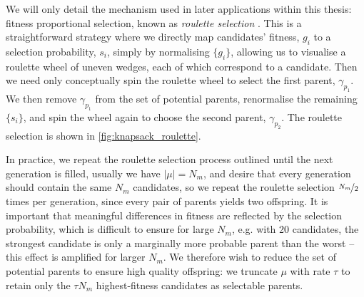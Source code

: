 We will only detail the mechanism used in later applications within this thesis: 
    fitness proportional selection, known as \emph{roulette selection} \cite{luke11}. 
This is a straightforward strategy where we directly map candidates' fitness, $g_i$ to a selection probability, $s_i$,
    simply by normalising $\{g_i\}$, 
    allowing us to visualise a roulette wheel of uneven wedges, each of which correspond to a candidate. 
Then we need only conceptually spin the roulette wheel to select the first parent, $\gamma_{p_1}$. 
We then remove $\gamma_{p_1}$ from the set of potential parents, renormalise the remaining $\{s_i\}$, 
    and spin the wheel again to choose the second parent, $\gamma_{p_2}$. 
The roulette selection is shown in \cref{fig:knapsack_roulette}.
\par 

In practice, we repeat the roulette selection process outlined until the next generation is filled, 
    usually we have $|\mu| = N_m$, and desire that every generation should contain the same 
    $N_m$ candidates, so we repeat the roulette selection $\nicefrac{N_m}{2}$ times per generation, 
    since every pair of parents yields two offspring.
It is important that meaningful differences in fitness are reflected by the selection probability, 
    which is difficult to ensure for large $N_m$, e.g. with 20 candidates, the strongest candidate is only 
    a marginally more probable parent than the worst -- this effect is amplified for larger $N_m$. 
We therefore wish to reduce the set of potential parents to ensure high quality offspring:
    we truncate $\mu$ with rate $\tau$ to retain only the $\tau N_m$ highest-fitness candidates as selectable parents.
\par 

